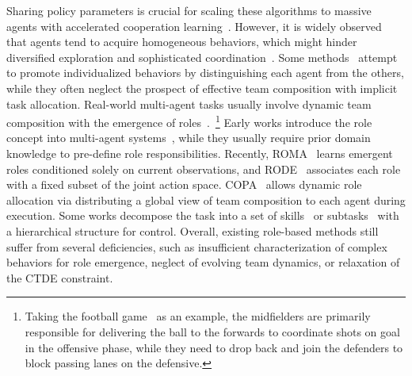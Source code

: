 \documentclass{article} %
\begin{document}
Sharing policy parameters is crucial for scaling these algorithms to massive agents with accelerated cooperation learning~\citep{fu2022revisiting}.
However, it is widely observed that agents tend to acquire homogeneous behaviors, which might hinder diversified exploration and sophisticated coordination~\citep{christianos2021scaling}.
Some methods~\citep{li2021celebrating,jiang2021emergence,liu2023contrastive} attempt to promote individualized behaviors by distinguishing each agent from the others, while they often neglect the prospect of effective team composition with implicit task allocation.
Real-world multi-agent tasks usually involve dynamic team composition with the emergence of roles~\citep{shao2022self,hu2022policy}.~\footnote{Taking the football game~\citep{kurach2020google} as an example, the midfielders are primarily responsible for delivering the ball to the forwards to coordinate shots on goal in the offensive phase, while they need to drop back and join the defenders to block passing lanes on the defensive.}
Early works introduce the role concept into multi-agent systems~\citep{dastani2003role,sims2008automated,lhaksmana2018role}, while they usually require prior domain knowledge to pre-define role responsibilities.
Recently, ROMA~\citep{wang2020roma} learns emergent roles conditioned solely on current observations, and RODE~\citep{wang2021rode} associates each role with a fixed subset of the joint action space. 
COPA~\citep{liu2021coach} allows dynamic role allocation via distributing a global view of team composition to each agent during execution.
Some works decompose the task into a set of skills~\citep{liu2022heterogeneous} or subtasks~\citep{yang2022ldsa,iqbal2022alma} with a hierarchical structure for control.
Overall, existing role-based methods still suffer from several deficiencies, such as insufficient characterization of complex behaviors for role emergence, neglect of evolving team dynamics, or relaxation of the CTDE constraint.
\end{document}
